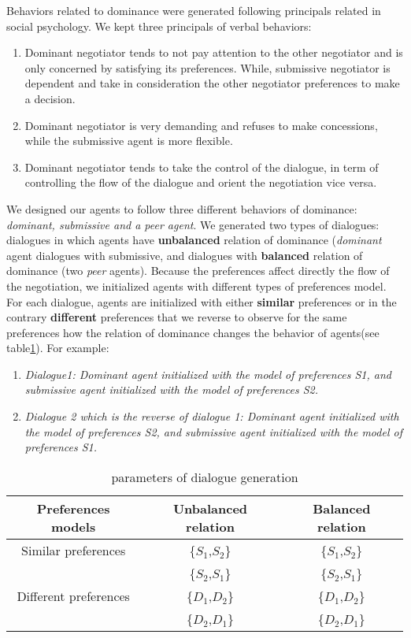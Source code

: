 \documentclass{llncs}
\begin{document}
Behaviors related to dominance were generated following principals related in social psychology. We kept three principals of verbal behaviors: 
\begin{enumerate}
	\item Dominant negotiator tends to not pay attention to the other negotiator and is only concerned by satisfying its preferences. While, submissive negotiator is dependent and take in consideration the other negotiator preferences to make a decision. \cite{van2006power}
	\item Dominant negotiator is very demanding and refuses to make concessions, while the submissive agent is more flexible. \cite{dreu1995impact}
	\item Dominant negotiator tends to take the control of the dialogue, in term of controlling the flow of the dialogue and orient the negotiation vice versa. \cite{galinsky2003power}
\end{enumerate}	
We designed our agents to follow three different behaviors of dominance:\textit{ dominant, submissive and a peer agent}. We generated two types of dialogues: dialogues in which agents have \textbf{unbalanced} relation of dominance (\textit{dominant} agent dialogues with submissive, and dialogues with \textbf{balanced} relation of dominance (two \textit{peer} agents). Because the preferences affect directly the flow of the negotiation, we initialized agents with different types of preferences model. For each dialogue, agents are initialized with either \textbf{similar} preferences or in the contrary \textbf{different} preferences that we reverse to observe for the same preferences how the relation of dominance changes the behavior of agents(see table\ref{table}). For example:
\begin{enumerate}
	\item \textit{Dialogue1: Dominant agent initialized with the model of preferences S1, and submissive agent initialized with the model of preferences S2.}
	\item \textit{Dialogue 2 which is the reverse of dialogue 1: Dominant agent initialized with the model of preferences S2, and submissive agent initialized with the model of preferences S1.}
\end{enumerate}
\begin{table}[h]
	\centering
	\begin{tabular}{|c|c|c|} 
		\hline
		Preferences models & Unbalanced relation & Balanced relation\\
		\hline
		Similar preferences & \{$S_1$,$S_2$\} & \{$S_1$,$S_2$\} \\
		\cline{2-3} 
		& \{$S_2$,$S_1$\} & \{$S_2$,$S_1$\} \\
		\hline
		Different preferences & \{$D_1$,$D_2$\} & \{$D_1$,$D_2$\} \\
		\cline{2-3} 
		& \{$D_2$,$D_1$\} & \{$D_2$,$D_1$\} \\
		\hline
	\end{tabular} 
		\caption{\label{table} parameters of dialogue generation}
\end{table}
\end{document}
